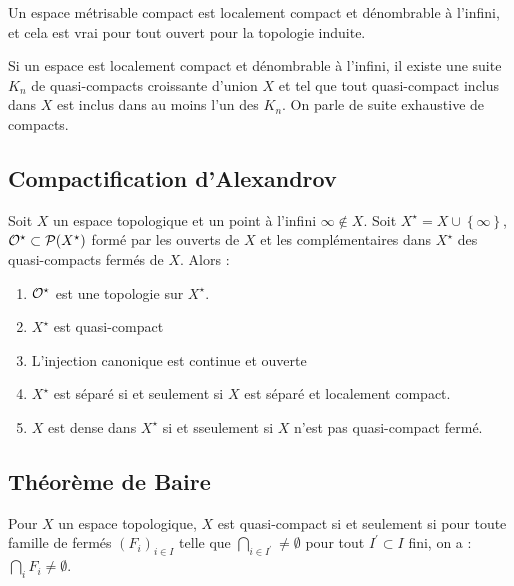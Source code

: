 \documentclass{cours}
\begin{document}
\begin{lemma}
    Un espace métrisable compact est localement compact et dénombrable à l'infini, et cela est vrai pour tout ouvert pour la topologie induite.
\end{lemma}

\begin{theorem}
    Si un espace est localement compact et dénombrable à l'infini, il existe une suite $K_{n}$ de quasi-compacts croissante d'union $X$ et tel que tout quasi-compact inclus dans $X$ est inclus dans au moins l'un des $K_{n}$. On parle de suite exhaustive de compacts.
\end{theorem}

\subsection{Compactification d'Alexandrov}
\begin{theorem}
    Soit $X$ un espace topologique et un point à l'infini $\infty \notin X$. Soit $X^{\star} = X\cup \left\{\infty\right\}$, $\mathcal{O}^{\star} \subset \mathcal{P}(X^{\star})$ formé par les ouverts de $X$ et les complémentaires dans $X^{\star}$ des quasi-compacts fermés de $X$. Alors :
    \begin{enumerate}
        \item $\mathcal{O}^{\star}$ est une topologie sur $X^{\star}$.
        \item $X^{\star}$ est quasi-compact
        \item L'injection canonique est continue et ouverte
        \item $X^{\star}$ est séparé si et seulement si $X$ est séparé et localement compact.
        \item $X$ est dense dans $X^{\star}$ si et sseulement si $X$ n'est pas quasi-compact fermé.
    \end{enumerate}
\end{theorem}

\subsection{Théorème de Baire}
\begin{lemma}
    Pour $X$ un espace topologique, $X$ est quasi-compact si et seulement si pour toute famille de fermés $(F_{i})_{i \in I}$ telle que $\bigcap_{i\in I^{'}} \neq \emptyset$ pour tout $I^{'} \subset I$ fini, on a : $\bigcap_{i} F_{i} \neq \emptyset$.
\end{lemma}
\end{document}
